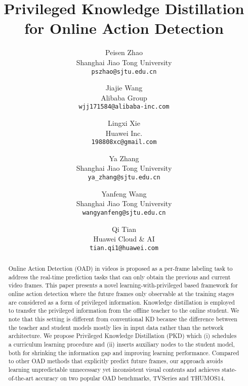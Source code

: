 \documentclass[final]{cvpr}
\begin{document}
\title{Privileged Knowledge Distillation for Online Action Detection}
                  
\author{Peisen Zhao\\
Shanghai Jiao Tong University\\
{\tt\small pszhao@sjtu.edu.cn}
\and
Jiajie Wang\\
Alibaba Group\\
{\tt\small wjj171584@alibaba-inc.com}
\and
Lingxi Xie\\
Huawei Inc.\\
{\tt\small 198808xc@gmail.com}
\and
Ya Zhang\\
Shanghai Jiao Tong University\\
{\tt\small ya\_zhang@sjtu.edu.cn}
\and
Yanfeng Wang\\
Shanghai Jiao Tong University\\
{\tt\small wangyanfeng@sjtu.edu.cn}
\and
Qi Tian\\
Huawei Cloud \& AI\\
{\tt\small tian.qi1@huawei.com}
}


\maketitle


\begin{abstract}
   
Online Action Detection (OAD) in videos is proposed as a per-frame labeling task to address the real-time prediction tasks that can only obtain the previous and current video frames. This paper presents a novel learning-with-privileged based framework for online action detection where the future frames only observable at the training stages are considered as a form of privileged information. Knowledge distillation is employed to transfer the privileged information from the offline teacher to the online student. We note that this setting is different from conventional KD because the difference between the teacher and student models mostly lies in input data rather than the network architecture. We propose Privileged Knowledge Distillation (PKD) which (i) schedules a curriculum learning procedure and (ii) inserts auxiliary nodes to the student model, both for shrinking the information gap and improving learning performance. Compared to other OAD methods that explicitly predict future frames, our approach avoids learning unpredictable unnecessary yet inconsistent visual contents and achieves state-of-the-art accuracy on two popular OAD benchmarks, TVSeries and THUMOS14.
\end{abstract}
\end{document}
